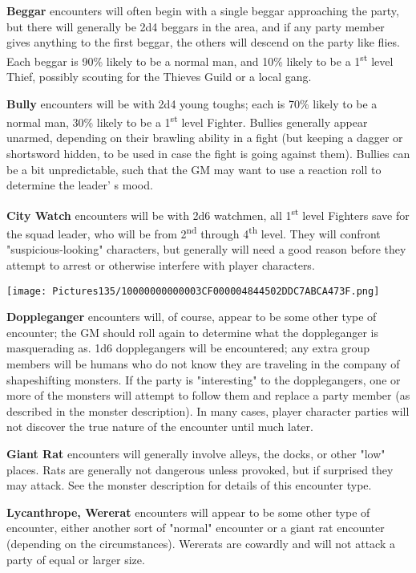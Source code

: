\documentclass[a4paper,twoside,openany,10pt]{book}
\begin{document}
\begin{multicols}{2}
\textbf{Beggar} encounters will often begin with a single beggar approaching the party, but there will generally be 2d4 beggars in the area, and if any party member gives anything to the first beggar, the others will descend on the party like flies. Each beggar is 90\% likely to be a normal man, and 10\% likely to be a 1\textsuperscript{st} level Thief, possibly scouting for the Thieves Guild or a local gang.


\textbf{Bully} encounters will be with 2d4 young toughs; each is 70\% likely to be a normal man, 30\% likely to be a 1\textsuperscript{st} level Fighter. Bullies generally appear unarmed, depending on their brawling ability in a fight (but keeping a dagger or shortsword hidden, to be used in case the fight is going against them). Bullies can be a bit unpredictable, such that the GM may want to use a reaction roll to determine the leader' s mood.

\textbf{City Watch }encounters will be with 2d6 watchmen, all 1\textsuperscript{st} level Fighters save for the squad leader, who will be from 2\textsuperscript{nd} through 4\textsuperscript{th} level. They will confront "suspicious-looking" characters, but generally will need a good reason before they attempt to arrest or otherwise interfere with player characters.


\begin{flushleft} \texttt{[image: Pictures135/10000000000003CF000004844502DDC7ABCA473F.png]}  \end{flushleft}

\textbf{Doppleganger} encounters will, of course, appear to be some other type of encounter; the GM should roll again to determine what the doppleganger is masquerading as. 1d6 dopplegangers will be encountered; any extra group members will be humans who do not know they are traveling in the company of shapeshifting monsters. If the party is "interesting" to the dopplegangers, one or more of the monsters will attempt to follow them and replace a party member (as described in the monster description). In many cases, player character parties will not discover the true nature of the encounter until much later. 

\textbf{Giant Rat} encounters will generally involve alleys, the docks, or other "low" places. Rats are generally not dangerous unless provoked, but if surprised they may attack. See the monster description for details of this encounter type.

\textbf{Lycanthrope, Wererat} encounters will appear to be some other type of encounter, either another sort of "normal" encounter or a giant rat encounter (depending on the circumstances). Wererats are cowardly and will not attack a party of equal or larger size.


\end{multicols}
\end{document}
